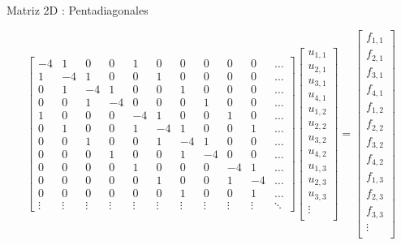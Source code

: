 \documentclass{beamer}
\begin{document}
\begin{frame}{Matriz 2D : Pentadiagonales}

{\tiny \[
\left[
\begin{array}{cccc|cccc|ccc}
-4 & 1 & 0 & 0 &  1 & 0 & 0 & 0 & 0 & 0 & \dots\\
1 &-4 & 1 & 0 &  0 & 1 & 0 & 0 & 0 & 0 & \dots\\
0 & 1 &-4 & 1 &  0 & 0 & 1 & 0 & 0 & 0 & \dots\\
0 & 0 & 1 &-4 &  0 & 0 & 0 & 1 & 0 & 0 & \dots\\
\hline
1 & 0 & 0 & 0 & -4 & 1 & 0 & 0 & 1 & 0 & \dots\\
0 & 1 & 0 & 0 &  1 &-4 & 1 & 0 & 0 & 1 & \dots\\
0 & 0 & 1 & 0 &  0 & 1 &-4 & 1 & 0 & 0 & \dots\\
0 & 0 & 0 & 1 &  0 & 0 & 1 &-4 & 0 & 0 & \dots\\
\hline
0 & 0 & 0 & 0 &  1 & 0 & 0 & 0 &-4 & 1 & \dots\\
0 & 0 & 0 & 0 &  0 & 1 & 0 & 0 & 1 &-4 & \dots\\
0 & 0 & 0 & 0 &  0 & 0 & 1 & 0 & 0 & 1 & \dots\\
\vdots & \vdots & \vdots & \vdots & \vdots & \vdots & \vdots & \vdots & \vdots & \vdots & \ddots 
\end{array} \right]
\left[
\begin{array}{c}
u_{1,1} \\ u_{2,1} \\ u_{3,1}  \\ u_{4,1} \\ \hline
u_{1,2} \\ u_{2,2} \\ u_{3,2}  \\ u_{4,2} \\ \hline
u_{1,3} \\ u_{2,3} \\ u_{3,3}  \\ \vdots \\
\end{array}
\right] = 
\left[
\begin{array}{c}
f_{1,1} \\ f_{2,1} \\ f_{3,1}  \\ f_{4,1} \\ \hline
f_{1,2} \\ f_{2,2} \\ f_{3,2}  \\ f_{4,2} \\ \hline
f_{1,3} \\ f_{2,3} \\ f_{3,3}  \\ \vdots \\
\end{array}
\right]	
\]}


\end{frame}
\end{document}
